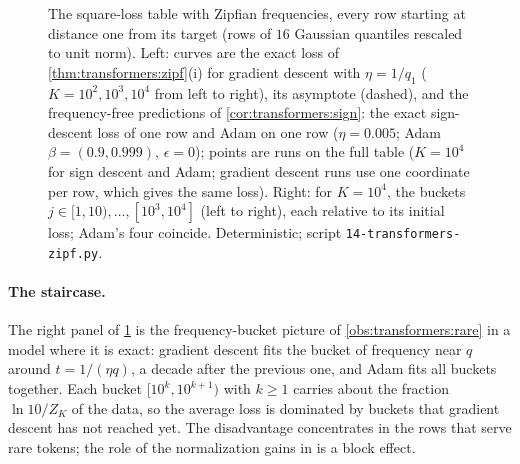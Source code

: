 \begin{refsection}
\begin{figure}[t]
\begin{fullwidth}
\end{fullwidth}
\caption{The square-loss table with Zipfian frequencies, every row starting at distance one from its target (rows of $16$ Gaussian quantiles rescaled to unit norm). Left: curves are the exact loss of \cref{thm:transformers:zipf}(i) for gradient descent with $\eta=1/q_1$ ($K=10^2,10^3,10^4$ from left to right), its asymptote (dashed), and the frequency-free predictions of \cref{cor:transformers:sign}: the exact sign-descent loss of one row and Adam on one row ($\eta=0.005$; Adam $\beta=(0.9,0.999)$, $\epsilon=0$); points are runs on the full table ($K=10^4$ for sign descent and Adam; gradient descent runs use one coordinate per row, which gives the same loss). Right: for $K=10^4$, the buckets $j\in[1,10),\dots,[10^3,10^4]$ (left to right), each relative to its initial loss; Adam's four coincide. Deterministic; script \texttt{14-transformers-zipf.py}.}
\label{fig:transformers:zipf}
\end{figure}

\paragraph{The staircase.} The right panel of \cref{fig:transformers:zipf} is the frequency-bucket picture of \cref{obs:transformers:rare} in a model where it is exact: gradient descent fits the bucket of frequency near $q$ around $t=1/(\eta q)$, a decade after the previous one, and Adam fits all buckets together. Each bucket $[10^k,10^{k+1})$ with $k\ge1$ carries about the fraction $\ln10/Z_K$ of the data, so the average loss is dominated by buckets that gradient descent has not reached yet. The disadvantage concentrates in the rows that serve rare tokens; the role of the normalization gains in \textcite{ZhaoEtAl2025} is a block effect.


\end{refsection}
